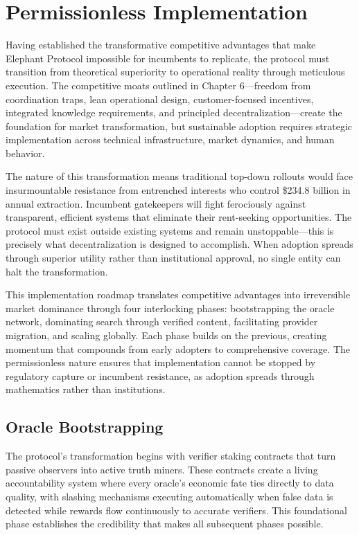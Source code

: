 \chapter{Permissionless Implementation}

Having established the transformative competitive advantages that make Elephant Protocol impossible for incumbents to replicate, the protocol must transition from theoretical superiority to operational reality through meticulous execution. The competitive moats outlined in Chapter 6---freedom from coordination traps, lean operational design, customer-focused incentives, integrated knowledge requirements, and principled decentralization---create the foundation for market transformation, but sustainable adoption requires strategic implementation across technical infrastructure, market dynamics, and human behavior.

The nature of this transformation means traditional top-down rollouts would face insurmountable resistance from entrenched interests who control \$234.8 billion in annual extraction. Incumbent gatekeepers will fight ferociously against transparent, efficient systems that eliminate their rent-seeking opportunities. The protocol must exist outside existing systems and remain unstoppable---this is precisely what decentralization is designed to accomplish. When adoption spreads through superior utility rather than institutional approval, no single entity can halt the transformation.

This implementation roadmap translates competitive advantages into irreversible market dominance through four interlocking phases: bootstrapping the oracle network, dominating search through verified content, facilitating provider migration, and scaling globally. Each phase builds on the previous, creating momentum that compounds from early adopters to comprehensive coverage. The permissionless nature ensures that implementation cannot be stopped by regulatory capture or incumbent resistance, as adoption spreads through mathematics rather than institutions.

\section{Oracle Bootstrapping}

The protocol's transformation begins with verifier staking contracts that turn passive observers into active truth miners. These contracts create a living accountability system where every oracle's economic fate ties directly to data quality, with slashing mechanisms executing automatically when false data is detected while rewards flow continuously to accurate verifiers. This foundational phase establishes the credibility that makes all subsequent phases possible.

